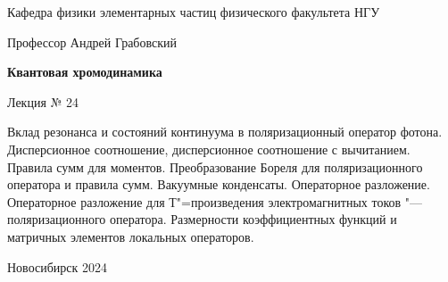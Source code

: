 \documentclass[12pt,pagesize,paper=landscape,paper=192mm:108mm]{scrbook}
\begin{document}
\begin{titlepage}
\begin{center}
    Кафедра физики элементарных частиц физического факультета НГУ
    \smallskip

    \Large
    Профессор Андрей Грабовский
    
    \smallskip

    \huge
    \textbf{Квантовая хромодинамика}
    \smallskip

    \Large
    Лекция № 24
    \vfill

    \normalsize
    \begin{minipage}{0.9\linewidth}
      Вклад резонанса и состояний континуума в поляризационный
      оператор фотона. Дисперсионное соотношение, дисперсионное
      соотношение с вычитанием. Правила сумм для
      моментов. Преобразование Бореля для поляризационного оператора и
      правила сумм. Вакуумные конденсаты. Операторное разложение.
      Операторное разложение для Т"=произведения электромагнитных токов
      "--- поляризационного оператора. Размерности коэффициентных функций
      и матричных элементов локальных операторов.
    \end{minipage}
    \vfill

    \normalsize \ccbysa\hspace{0.5em}  Новосибирск 2024
  \end{center}
\end{titlepage}
\end{document}
